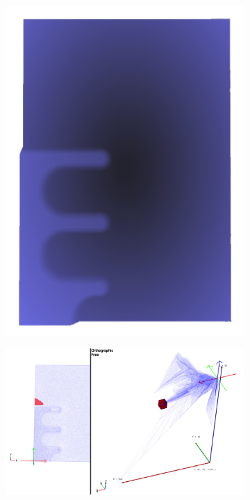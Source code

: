 \documentclass[a4paper,fontsize=12pt,toc=bib,parskip=half,ngerman]{scrartcl}
\begin{document}
\begin{figure}
	\begin{subfigure}{0.2\textwidth}
		\centering
		\includegraphics[width=\textwidth]{pictures/results/Nodel/Nodel_Object.png}
		\subcaption{}
		\label{NodelObject}
	\end{subfigure}
	\hspace*{\fill}
	\begin{subfigure}{0.45\textwidth}
		\centering
		\includegraphics[width=\textwidth]{pictures/results/Nodel/Nodel_Raith.png}

\end{subfigure}
\end{figure}
\end{document}
